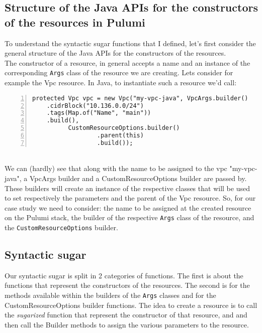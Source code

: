 \subsection{Structure of the Java APIs for the constructors of the resources in Pulumi}
To understand the syntactic sugar functions that I defined, let's first consider the general structure of the Java APIs for the constructors of the resources.\\
The constructor of a resource, in general accepts a name and an instance of the corresponding \texttt{Args} class of the resource we are creating.
Lets consider for example the Vpc resource.
In Java, to instantiate such a resource we'd call:
\begin{lstlisting}[numbers=left, numberstyle=\tiny, numbersep=-5pt, stepnumber=1]
  protected Vpc vpc = new Vpc("my-vpc-java", VpcArgs.builder()
    .cidrBlock("10.136.0.0/24")
    .tags(Map.of("Name", "main"))
    .build(),
          CustomResourceOptions.builder()
                  .parent(this)
                  .build());
\end{lstlisting}\mbox{}\\
We can (hardly) see that along with the name to be assigned to the vpc "my-vpc-java", a VpcArgs builder and a CustomResourceOptions builder are passed by.
These builders will create an instance of the respective classes that will be used to set respectively the parameters and the parent of the Vpc resource.
So, for our case study we need to consider: the name to be assigned at the created resource on the Pulumi stack, the builder of the respective \texttt{Args} class of the resource, and the \texttt{CustomResourceOptions} builder.


\subsection{Syntactic sugar}
Our syntactic sugar is split in 2 categories of functions.
The first is about the functions that represent the constructors of the resources.
The second is for the methods available within the builders of the \texttt{Args} classes and for the CustomResourceOptions builder functions.
The idea to create a resource is to call the \textit{sugarized} function that represent the constructor of that resource, and and then call the Builder methods to assign the various parameters to the resource.

